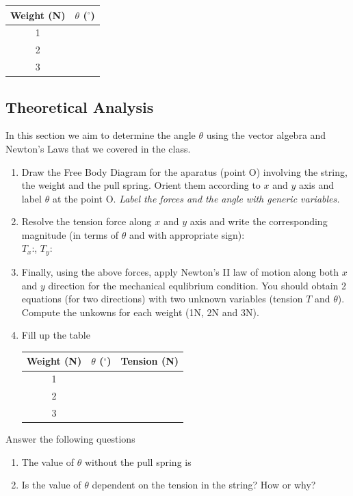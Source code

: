 \documentclass[10pt]{article}
\begin{document}
\begin{center}
 \begin{tabular}{||c c||} 
 \hline
 Weight (N) & $\theta$ ($^{\circ}$) \\ [0.5ex] 
 \hline\hline
 1 &   \\ 
 \hline
 2 &  \\
\hline
 3 & \\
\hline
\end{tabular}
\end{center}
\subsection{Theoretical Analysis}
In this section we aim to determine the angle $\theta$ using the vector algebra and Newton's Laws that we covered in the class.
\begin{enumerate}
\item Draw the Free Body Diagram for the aparatus (point O) involving the string, the weight and the pull spring.  Orient them according to $x$ and $y$ axis and label $\theta$ at the point O.
\emph{Label the forces and the angle with generic variables.}
\vspace{250px}
\item Resolve the tension force along $x$ and $y$ axis and write the corresponding magnitude (in terms of $\theta$ and with appropriate sign):\\
$T_x$:\underline{\hspace{5cm}}, $T_y$:\underline{\hspace{5cm}}
\item Finally, using the above forces, apply Newton's II law of motion along both $x$ and $y$ direction for the mechanical equlibrium condition.  You should obtain 2 equations (for two directions) with two unknown variables (tension $T$ and $\theta$).  Compute the unkowns for each weight (1N, 2N and 3N).
\vspace{500px}
\item Fill up the table
\begin{center}
 \begin{tabular}{||c c c||} 
 \hline
 Weight (N) & $\theta$ ($^{\circ}$) & Tension (N)\\ [0.5ex] 
 \hline\hline
 1 &  & \\ 
 \hline
 2 &  &\\
\hline
 3 & &\\
\hline
\end{tabular}
\end{center}
\end{enumerate}
Answer the following questions
\begin{enumerate}
\item The value of $\theta$ without the pull spring is \underline{\hspace{3cm}}
\item Is the value of $\theta$ dependent on the tension in the string? How or why?
\end{enumerate}
\end{document}
